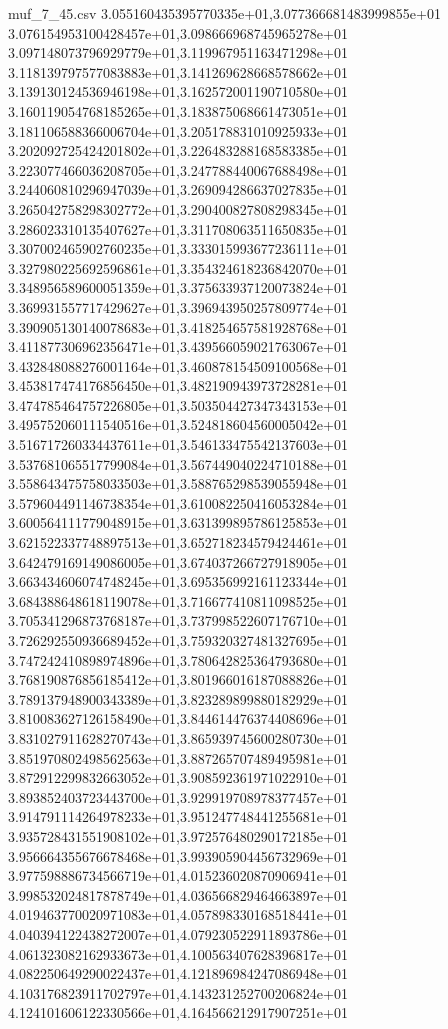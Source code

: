 \begin{filecontents*}{muf_7_45.csv}
3.055160435395770335e+01,3.077366681483999855e+01
3.076154953100428457e+01,3.098666968745965278e+01
3.097148073796929779e+01,3.119967951163471298e+01
3.118139797577083883e+01,3.141269628668578662e+01
3.139130124536946198e+01,3.162572001190710580e+01
3.160119054768185265e+01,3.183875068661473051e+01
3.181106588366006704e+01,3.205178831010925933e+01
3.202092725424201802e+01,3.226483288168583385e+01
3.223077466036208705e+01,3.247788440067688498e+01
3.244060810296947039e+01,3.269094286637027835e+01
3.265042758298302772e+01,3.290400827808298345e+01
3.286023310135407627e+01,3.311708063511650835e+01
3.307002465902760235e+01,3.333015993677236111e+01
3.327980225692596861e+01,3.354324618236842070e+01
3.348956589600051359e+01,3.375633937120073824e+01
3.369931557717429627e+01,3.396943950257809774e+01
3.390905130140078683e+01,3.418254657581928768e+01
3.411877306962356471e+01,3.439566059021763067e+01
3.432848088276001164e+01,3.460878154509100568e+01
3.453817474176856450e+01,3.482190943973728281e+01
3.474785464757226805e+01,3.503504427347343153e+01
3.495752060111540516e+01,3.524818604560005042e+01
3.516717260334437611e+01,3.546133475542137603e+01
3.537681065517799084e+01,3.567449040224710188e+01
3.558643475758033503e+01,3.588765298539055948e+01
3.579604491146738354e+01,3.610082250416053284e+01
3.600564111779048915e+01,3.631399895786125853e+01
3.621522337748897513e+01,3.652718234579424461e+01
3.642479169149086005e+01,3.674037266727918905e+01
3.663434606074748245e+01,3.695356992161123344e+01
3.684388648618119078e+01,3.716677410811098525e+01
3.705341296873768187e+01,3.737998522607176710e+01
3.726292550936689452e+01,3.759320327481327695e+01
3.747242410898974896e+01,3.780642825364793680e+01
3.768190876856185412e+01,3.801966016187088826e+01
3.789137948900343389e+01,3.823289899880182929e+01
3.810083627126158490e+01,3.844614476374408696e+01
3.831027911628270743e+01,3.865939745600280730e+01
3.851970802498562563e+01,3.887265707489495981e+01
3.872912299832663052e+01,3.908592361971022910e+01
3.893852403723443700e+01,3.929919708978377457e+01
3.914791114264978233e+01,3.951247748441255681e+01
3.935728431551908102e+01,3.972576480290172185e+01
3.956664355676678468e+01,3.993905904456732969e+01
3.977598886734566719e+01,4.015236020870906941e+01
3.998532024817878749e+01,4.036566829464663897e+01
4.019463770020971083e+01,4.057898330168518441e+01
4.040394122438272007e+01,4.079230522911893786e+01
4.061323082162933673e+01,4.100563407628396817e+01
4.082250649290022437e+01,4.121896984247086948e+01
4.103176823911702797e+01,4.143231252700206824e+01
4.124101606122330566e+01,4.164566212917907251e+01

\end{filecontents*}
